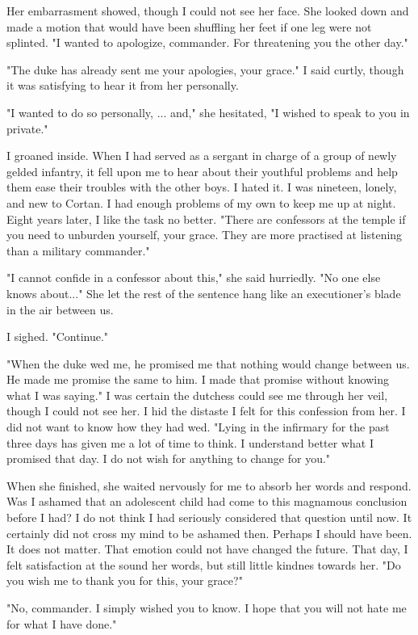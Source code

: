 \documentclass{article}
\begin{document}
Her embarrasment showed, though I could not see her face. She looked down and made a motion that would have been shuffling her feet if one leg were not splinted. "I wanted to apologize, commander. For threatening you the other day."

"The duke has already sent me your apologies, your grace." I said curtly, though it was satisfying to hear it from her personally.

"I wanted to do so personally, ... and," she hesitated, "I wished to speak to you in private."

I groaned inside. When I had served as a sergant in charge of a group of newly gelded infantry, it fell upon me to hear about their youthful problems and help them ease their troubles with the other boys. I hated it. I was nineteen, lonely, and new to Cortan. I had enough problems of my own to keep me up at night. Eight years later, I like the task no better. "There are confessors at the temple if you need to unburden yourself, your grace. They are more practised at listening than a military commander."

"I cannot confide in a confessor about this," she said hurriedly. "No one else knows about..." She let the rest of the sentence hang like an executioner's blade in the air between us. 

I sighed. "Continue."

"When the duke wed me, he promised me that nothing would change between us. He made me promise the same to him. I made that promise without knowing what I was saying." I was certain the dutchess could see me through her veil, though I could not see her. I hid the distaste I felt for this confession from her. I did not want to know how they had wed. "Lying in the infirmary for the past three days has given me a lot of time to think. I understand better what I promised that day. I do not wish for anything to change for you."

When she finished, she waited nervously for me to absorb her words and respond. Was I ashamed that an adolescent child had come to this magnamous conclusion before I had? I do not think I had seriously considered that question until now. It certainly did not cross my mind to be ashamed then. Perhaps I should have been. It does not matter. That emotion could not have changed the future. That day, I felt satisfaction at the sound her words, but still little kindnes towards her. "Do you wish me to thank you for this, your grace?"

"No, commander. I simply wished you to know. I hope that you will not hate me for what I have done." 
\end{document}
